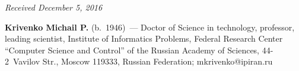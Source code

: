 \vspace*{-3pt}

\hfill{\small\textit{Received December 5, 2016}}


\Contrl

\noindent
\textbf{Krivenko Michail P.} (b.\ 1946)~--- Doctor of Science in technology, 
professor, leading scientist, Institute of Informatics Problems, Federal Research 
Center ``Computer Science and Control'' of the Russian Academy of Sciences, 
\mbox{44-2}~Vavilov Str., Moscow 119333, Russian Federation; \mbox{mkrivenko@ipiran.ru}

\label{end\stat}


\renewcommand{\bibname}{\protect\rm Литература} 